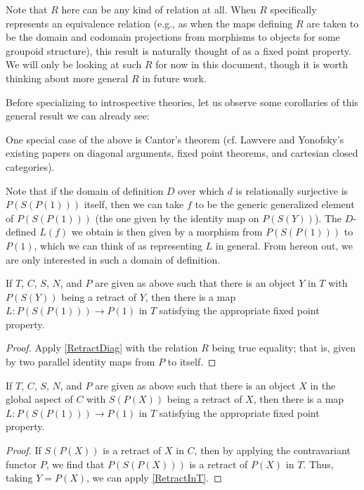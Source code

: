 Note that $R$ here can be any kind of relation at all. When $R$ specifically represents an equivalence relation (e.g., as when the maps defining $R$ are taken to be the domain and codomain projections from morphisms to objects for some groupoid structure), this result is naturally thought of as a fixed point property. We will only be looking at such $R$ for now in this document, though it is worth thinking about more general $R$ in future work.

Before specializing to introspective theories, let us observe some corollaries of this general result we can already see:

\begin{observation}
One special case of the above is Cantor's theorem (cf. Lawvere and Yonofsky's existing papers on diagonal arguments, fixed point theorems, and cartesian closed categories). 
\end{observation}

\begin{corollary}\label{RetractDiag}
Note that if the domain of definition $D$ over which $d$ is relationally surjective is $P(S(P(1)))$ itself, then we can take $f$ to be the generic generalized element of $P(S(P(1)))$ (the one given by the identity map on $P(S(Y))$). The $D$-defined $L(f)$ we obtain is then given by a morphism from $P(S(P(1)))$ to $P(1)$, which we can think of as representing $L$ in general. From hereon out, we are only interested in such a domain of definition. 
\end{corollary}

\begin{corollary}\label{RetractInT}
If $T$, $C$, $S$, $N$, and $P$ are given as above such that there is an object $Y$ in $T$ with $P(S(Y))$ being a retract of $Y$, then there is a map $L : P(S(P(1))) \to P(1)$ in $T$ satisfying the appropriate fixed point property.
\end{corollary}
\begin{proof}
Apply \cref{RetractDiag} with the relation $R$ being true equality; that is, given by two parallel identity maps from $P$ to itself.
\end{proof}

\begin{corollary}\label{RetractInC}
If $T$, $C$, $S$, $N$, and $P$ are given as above such that there is an object $X$ in the global aspect of $C$ with $S(P(X))$ being a retract of $X$, then there is a map $L : P(S(P(1))) \to P(1)$ in $T$ satisfying the appropriate fixed point property.
\end{corollary}
\begin{proof}
If $S(P(X))$ is a retract of $X$ in $C$, then by applying the contravariant functor $P$, we find that $P(S(P(X)))$ is a retract of $P(X)$ in $T$. Thus, taking $Y = P(X)$, we can apply \cref{RetractInT}.
\end{proof}

